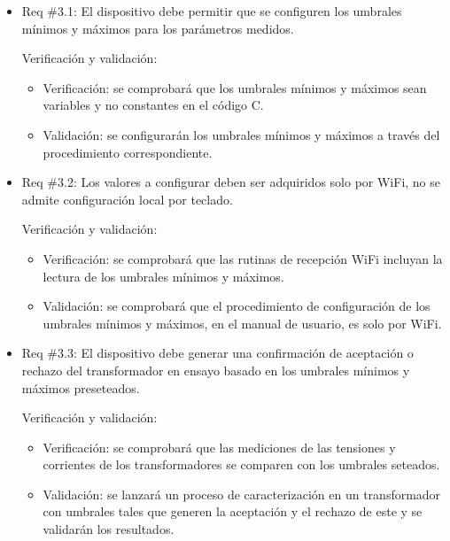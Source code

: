 \documentclass[11pt]{charter}
\begin{document}
\begin{itemize} 
\item Req \#3.1: El dispositivo debe permitir que se configuren los umbrales mínimos y máximos para los parámetros medidos. 

Verificación y validación:

\begin{itemize}
\item Verificación: se comprobará que los umbrales mínimos y máximos sean variables y no constantes en el código C.
\item Validación: se configurarán los umbrales mínimos y máximos a través del procedimiento correspondiente.
\end{itemize}

\end{itemize}

\begin{itemize} 
\item Req \#3.2: Los valores a configurar deben ser adquiridos solo por WiFi, no se admite configuración local por teclado.

Verificación y validación:

\begin{itemize}
\item Verificación: se comprobará que las rutinas de recepción WiFi incluyan la lectura de los umbrales mínimos y máximos.
\item Validación: se comprobará que el procedimiento de configuración de los umbrales mínimos y máximos, en el manual de usuario, es solo por WiFi. 
\end{itemize}

\end{itemize}


\begin{itemize} 
\item Req \#3.3: El dispositivo debe generar una confirmación de aceptación o rechazo del transformador en ensayo basado en los umbrales mínimos y máximos preseteados.

Verificación y validación:

\begin{itemize}
\item Verificación: se comprobará que las mediciones de las tensiones y corrientes de los transformadores se comparen con los umbrales seteados.
\item Validación: se lanzará un proceso de caracterización en un transformador con umbrales tales que generen la aceptación y el rechazo de este y se validarán los resultados.
\end{itemize}

\end{itemize}
\end{document}
